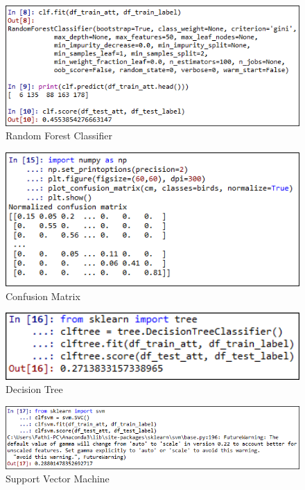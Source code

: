 \begin{figure}
	\centerline{\includegraphics[width=1\textwidth]{figures/fathi/chapter3/hari2/4.png}}
	\caption{Random Forest Classifier}
	\label{p1}
\end{figure}

\begin{figure}
	\centerline{\includegraphics[width=1\textwidth]{figures/fathi/chapter3/hari2/5.png}}
	\caption{Confusion Matrix}
	\label{p2}
\end{figure}

\begin{figure}
	\centerline{\includegraphics[width=1\textwidth]{figures/fathi/chapter3/hari2/6.png}}
	\caption{Decision Tree}
	\label{p3}
\end{figure}

\begin{figure}
	\centerline{\includegraphics[width=1\textwidth]{figures/fathi/chapter3/hari2/7.png}}
	\caption{Support Vector Machine}
	\label{p4}
\end{figure}


